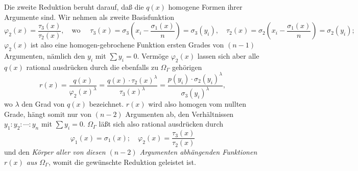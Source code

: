 Die zweite Reduktion beruht darauf, daß die $q(x)$ homogene Formen ihrer Argumente sind. Wir nehmen als zweite Basisfunktion
\[
\varphi_2(x)=\frac{\tau_3(x)}{\tau_2(x)},\quad \text{wo }\quad
\tau_3(x)=\sigma_3\left(x_i-\frac{\sigma_1(x)}{n}\right)=\sigma_3(y_i),\quad
\tau_2(x)=\sigma_2\left(x_i-\frac{\sigma_1(x)}{n}\right)=\sigma_2(y_i);
\]
$\varphi_2(x)$ ist also eine homogen-gebrochene Funktion ersten Grades von $(n-1)$ Argumenten, nämlich den $y_i$ mit $\sum y_i=0$. Vermöge $\varphi_2(x)$ lassen sich aber alle $q(x)$ rational ausdrücken durch die ebenfalls zu $\Omega_\Gamma$ gehörigen
\[
r(x)=\frac{q(x)}{\varphi_2(x)^\lambda}=\frac{q(x)\cdot\tau_2(x)^\lambda}{\tau_3(x)^\lambda}=\frac{p(y_i)\cdot\sigma_2(y_i)^\lambda}{\sigma_3(y_i)^\lambda},
\]
wo $\lambda$ den Grad von $q(x)$ bezeichnet. $r(x)$ wird also homogen vom nullten Grade, hängt somit nur von $(n-2)$ Argumenten ab, den Verhältnissen $y_1:y_2:\cdots:y_n$ mit $\sum y_i=0$. $\Omega_\Gamma$ läßt sich also rational ausdrücken durch
\[
\varphi_1(x)=\sigma_1(x);\quad \varphi_2(x)=\frac{\tau_3(x)}{\tau_2(x)}
\]
und den \emph{Körper aller von diesen $(n-2)$ Argumenten abhängenden Funktionen $r(x)$ aus $\Omega_\Gamma$}, womit die gewünschte Reduktion geleistet ist.

